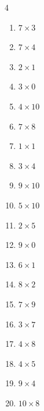 \begin{multicols}{4}
\begin{enumerate}
  \item $7\times 3$
        \phantom{$=21$}

  \item $7\times 4$
        \phantom{$=28$}

  \item $2\times 1$
        \phantom{$=2$}

  \item $3\times 0$
        \phantom{$=0$}

\columnbreak %

\resetques

  \item $4\times 10$
        \phantom{$=40$}

  \item $7\times 8$
        \phantom{$=56$}

  \item $1\times 1$
        \phantom{$=1$}

  \item $3\times 4$
        \phantom{$=12$}

  \item $9\times 10$
        \phantom{$=90$}

  \item $5\times 10$
        \phantom{$=50$}

  \item $2\times 5$
        \phantom{$=10$}

  \item $9\times 0$
        \phantom{$=0$}

  \item $6\times 1$
        \phantom{$=6$}

  \item $8\times 2$
        \phantom{$=16$}

  \item $7\times 9$
        \phantom{$=63$}

  \item $3\times 7$
        \phantom{$=21$}

  \item $4\times 8$
        \phantom{$=32$}

  \item $4\times 5$
        \phantom{$=20$}

  \item $9\times 4$
        \phantom{$=36$}

  \item $10\times 8$
        \phantom{$=80$}


\end{enumerate}
\end{multicols}
